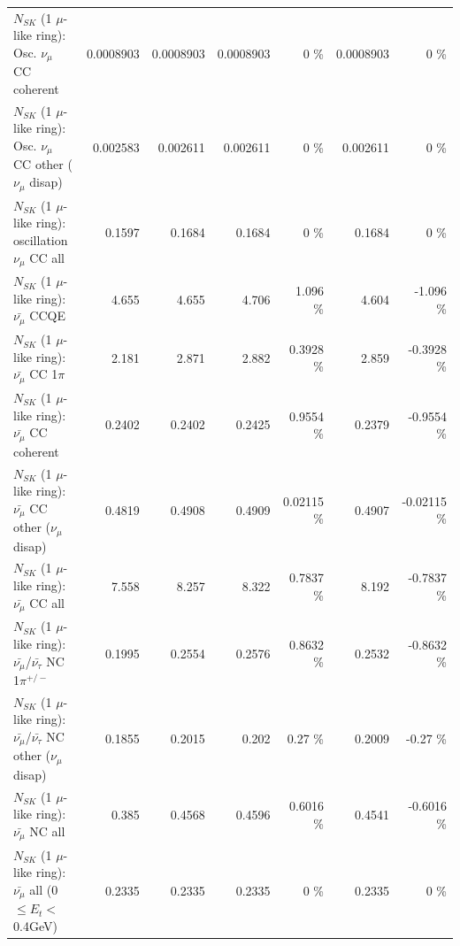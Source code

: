 \begin{table}
\begin{tabular}{| l | r | r | r  r | r  r |}
                        $N_{SK}$ (1 $\mu$-like ring): Osc. $\nu_\mu$ CC coherent &       0.0008903 &       0.0008903 &       0.0008903 &        0 \%  &       0.0008903 &        0 \%  \\ 
         $N_{SK}$ (1 $\mu$-like ring): Osc. $\nu_\mu$ CC other ($\nu_\mu$ disap) &        0.002583 &        0.002611 &        0.002611 &        0 \%  &        0.002611 &        0 \%  \\ 
                      $N_{SK}$ (1 $\mu$-like ring): oscillation $\nu_\mu$ CC all &          0.1597 &          0.1684 &          0.1684 &        0 \%  &          0.1684 &        0 \%  \\ 
\hline
\hline
                              $N_{SK}$ (1 $\mu$-like ring): $\bar{\nu_\mu}$ CCQE &           4.655 &           4.655 &           4.706 &    1.096 \%  &           4.604 &   -1.096 \%  \\ 
                         $N_{SK}$ (1 $\mu$-like ring): $\bar{\nu_\mu}$ CC 1$\pi$ &           2.181 &           2.871 &           2.882 &   0.3928 \%  &           2.859 &  -0.3928 \%  \\ 
                       $N_{SK}$ (1 $\mu$-like ring): $\bar{\nu_\mu}$ CC coherent &          0.2402 &          0.2402 &          0.2425 &   0.9554 \%  &          0.2379 &  -0.9554 \%  \\ 
        $N_{SK}$ (1 $\mu$-like ring): $\bar{\nu_\mu}$ CC other ($\nu_\mu$ disap) &          0.4819 &          0.4908 &          0.4909 &  0.02115 \%  &          0.4907 & -0.02115 \%  \\ 
                          $N_{SK}$ (1 $\mu$-like ring): $\bar{\nu_{\mu}}$ CC all &           7.558 &           8.257 &           8.322 &   0.7837 \%  &           8.192 &  -0.7837 \%  \\ 
\hline
  $N_{SK}$ (1 $\mu$-like ring): $\bar{\nu_\mu}$/$\bar{\nu_\tau}$ NC 1$\pi^{+/-}$ &          0.1995 &          0.2554 &          0.2576 &   0.8632 \%  &          0.2532 &  -0.8632 \%  \\ 
$N_{SK}$ (1 $\mu$-like ring): $\bar{\nu_\mu}$/$\bar{\nu_\tau}$ NC other ($\nu_\mu$ disap) &          0.1855 &          0.2015 &           0.202 &     0.27 \%  &          0.2009 &    -0.27 \%  \\ 
                          $N_{SK}$ (1 $\mu$-like ring): $\bar{\nu_{\mu}}$ NC all &           0.385 &          0.4568 &          0.4596 &   0.6016 \%  &          0.4541 &  -0.6016 \%  \\ 
\hline
   $N_{SK}$ (1 $\mu$-like ring): $\bar{\nu_{\mu}}$ all (0 $\leq E_{t} <$ 0.4GeV) &          0.2335 &          0.2335 &          0.2335 &        0 \%  &          0.2335 &        0 \%  \\ 

\end{tabular}
\end{table}
